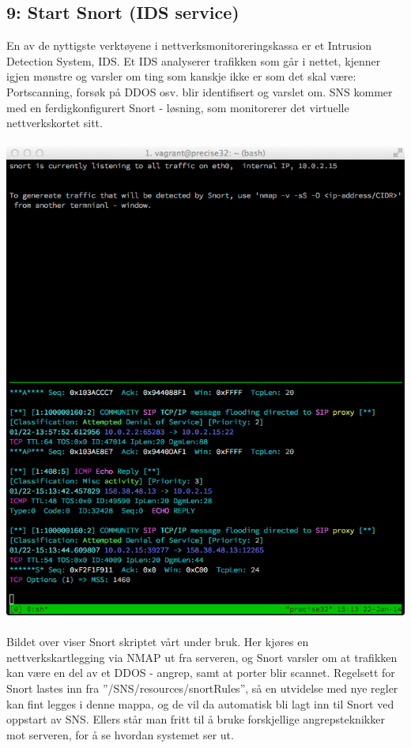 \documentclass{article}
\begin{document}
\subsection{9: Start Snort (IDS service)}
En av de nyttigste verktøyene i nettverksmonitoreringskassa er et Intrusion Detection System, IDS. Et IDS analyserer trafikken som går i nettet, kjenner igjen mønstre og varsler om ting som kanskje ikke er som det skal være: Portscanning, forsøk på DDOS osv. blir identifisert og varslet om. SNS kommer med en ferdigkonfigurert Snort - løsning, som monitorerer det virtuelle nettverkskortet sitt.
\\
\\
\includegraphics[scale = 0.7]{pictures/snort.png}
\\
\\
Bildet over viser Snort skriptet vårt under bruk. Her kjøres en nettverkskartlegging via NMAP ut fra serveren, og Snort varsler om at trafikken kan være en del av et DDOS - angrep, samt at porter blir scannet. Regelsett for Snort lastes inn fra ''/SNS/resources/snortRules'', så en utvidelse med nye regler kan fint legges i denne mappa, og de vil da automatisk bli lagt inn til Snort ved oppstart av SNS. Ellers står man fritt til å bruke forskjellige angrepsteknikker mot serveren, for å se hvordan systemet ser ut. 
\end{document}
